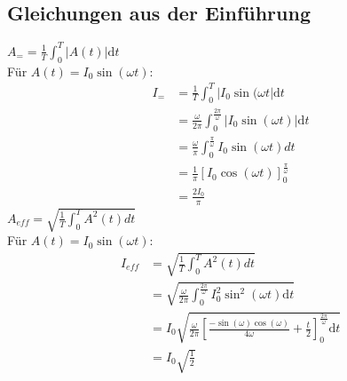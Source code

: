 \subsection{Gleichungen aus der Einführung}
$A_= =\frac{1}{T}\int_{0}^{T}|A(t)|\text{d}t$\\
Für $A(t)=I_0\sin (\omega t)$:
\begin{align*}
I_=  &=\frac{1}{T}\int_{0}^{T}|I_0\sin (\omega t|\text{d}t\\
&=\frac{\omega}{2\pi}\int_{0}^{\frac{2\pi}{\omega}}|I_0\sin (\omega t)| \text{d}t\\
&=\frac{\omega}{\pi}\int_{0}^{\frac{\pi}{\omega}}I_0\sin (\omega t) dt\\
&=\frac{1}{\pi}\left[ I_0\cos(\omega t) \right]_0^{\frac{\pi}{\omega}}\\
&=\frac{2I_0}{\pi}
\end{align*}
$A_{eff}=\sqrt{\frac{1}{T}\int_{0}^{T} A^2(t)dt}$\\
Für $A(t)=I_0\sin (\omega t)$:
\begin{align*}
I_{eff}&=\sqrt{\frac{1}{T}\int_{0}^{T} A^2(t)dt}	\\
&=\sqrt{\frac{\omega}{2\pi}\int_{0}^{\frac{2\pi}{\omega}}I_0^2\sin^2 (\omega t)\text{d}t}\\
&=I_0\sqrt{\frac{\omega}{2\pi}\left[  \frac{-\sin(\omega)\cos(\omega)}{4\omega}+\frac{t}{2} \right]_0^{\frac{2\pi}{\omega}}\text{d}t}\\
&=I_0\sqrt{\frac{1}{2}}
\end{align*}